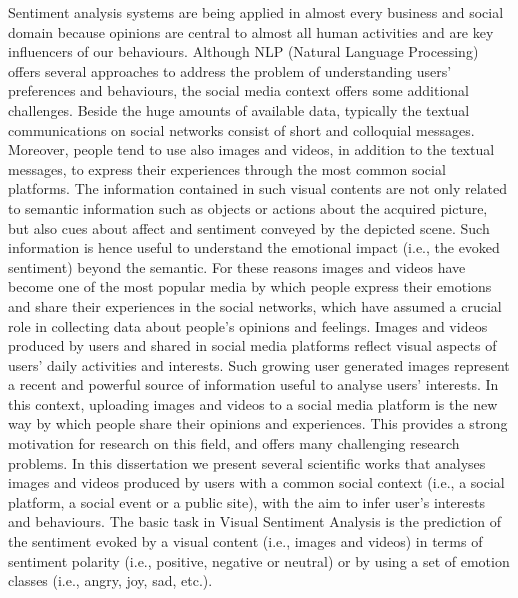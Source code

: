 Sentiment analysis systems are being applied in almost every business and social domain because opinions are central to almost all human activities and are key influencers of our behaviours. 
Although NLP (Natural Language Processing) offers several approaches to address the problem of understanding users' preferences and behaviours, the social media context offers some additional challenges. Beside the huge amounts of available data, typically the textual communications on social networks consist of short and colloquial messages. Moreover, people tend to use also images and videos, in addition to the textual messages, to express their experiences through the most common social platforms.
The information contained in such visual contents are not only related to semantic information such as objects or actions about the acquired picture, but also cues about affect and sentiment conveyed by the depicted scene. Such information is hence useful to understand the emotional impact (i.e., the evoked sentiment) beyond the semantic.
For these reasons images and videos have become one of the most popular media by which people express their emotions and share their experiences in the social networks, which have assumed a crucial role in collecting data about people's opinions and feelings. 
Images and videos produced by users and shared in social media platforms reflect visual aspects of users' daily activities and interests. Such growing user generated images represent a recent and powerful source of information useful to analyse users' interests. 
In this context, uploading images and videos to a social media platform is the new way by which people share their opinions and experiences.  
This provides a strong motivation for research on this field, and offers many challenging research problems.
In this dissertation we present several scientific works that analyses images and videos produced by users with a common social context (i.e., a social platform, a social event or a public site), with the aim to infer user's interests and behaviours.
The basic task in Visual Sentiment Analysis is the prediction of the sentiment evoked by a visual content (i.e., images and videos) in terms of sentiment polarity (i.e., positive, negative or neutral) or by using a set of emotion classes (i.e., angry, joy, sad, etc.).
